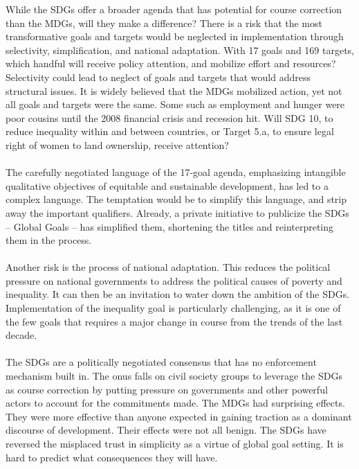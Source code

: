 While the SDGs offer a broader agenda that has potential for course correction than the MDGs, will they make a difference? There is a risk that the most transformative goals and targets would be neglected in implementation through selectivity, simplification, and national adaptation. With 17 goals and 169 targets, which handful will receive policy attention, and mobilize effort and resources? Selectivity could lead to neglect of goals and targets that would address structural issues. It is widely believed that the MDGs mobilized action, yet not all goals and targets were the same. Some such as employment and hunger were poor cousins until the 2008 financial crisis and recession hit. Will SDG 10, to reduce inequality within and between countries, or Target 5.a, to ensure legal right of women to land ownership, receive attention? \\
\\
The carefully negotiated language of the 17-goal agenda, emphasizing intangible qualitative
objectives of equitable and sustainable development, has led to a complex language. The temptation would be to simplify this language, and strip away the important qualifiers. Already, a private initiative to publicize the SDGs – Global Goals – has simplified them, shortening the titles and reinterpreting them in the process. \\
\\ 
Another risk is the process of national adaptation. This reduces the political pressure on national governments to address the political causes of poverty and inequality. It can then be an invitation to water down the ambition of the SDGs. Implementation of the inequality goal is particularly challenging, as it is one of the few goals that requires a major change in course from the trends of the last decade. \\
\\
The SDGs are a politically negotiated consensus that has no enforcement mechanism built in. The onus falls on civil society groups to leverage the SDGs as course correction by putting pressure on governments and other powerful actors to account for the commitments made.
The MDGs had surprising effects. They were more effective than anyone expected in gaining traction as a dominant discourse of development. Their effects were not all benign. The SDGs have reversed the misplaced trust in simplicity as a virtue of global goal setting. It is hard to predict what consequences they will have. 
\clearpage